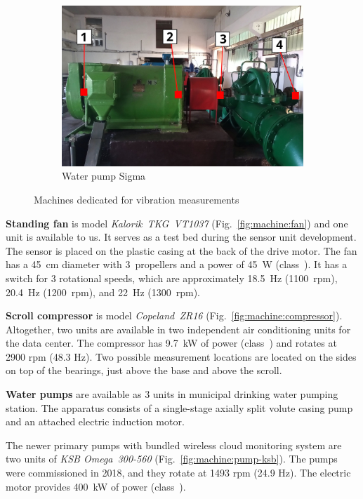 \begin{figure}[ht]
\begin{subfigure}[b]{0.31\textwidth}
        \includegraphics[width=\textwidth]{assets/design/sensor/sigma-pump.jpg}
        \caption{\footnotesize Water pump Sigma}
        \label{fig:machine:pump-sigma}
    \end{subfigure}
    \caption{Machines dedicated for vibration measurements}
\end{figure}

\textbf{Standing fan} is model \emph{Kalorik~TKG~VT1037} (Fig.~\ref{fig:machine:fan}) and one unit is available to us. It serves as a test bed during the sensor unit development. The sensor is placed on the plastic casing at the back of the drive motor. The fan has a 45~cm diameter with 3~propellers and a power of 45~W (class~). It has a switch for 3 rotational speeds, which are approximately 18.5~Hz (1100~rpm), 20.4~Hz (1200~rpm), and 22~Hz (1300~rpm).

\textbf{Scroll compressor} is model \emph{Copeland~ZR16} (Fig.~\ref{fig:machine:compressor}). Altogether, two units are available in two independent air conditioning units for the data center. The compressor has 9.7~kW of power (class~) and rotates at 2900 rpm (48.3 Hz). Two possible measurement locations are located on the sides on top of the bearings, just above the base and above the scroll.

\textbf{Water pumps} are available as 3 units in municipal drinking water pumping station. The apparatus consists of a single-stage axially split volute casing pump and an attached electric induction motor. 

The newer primary pumps with bundled wireless cloud monitoring system are two units of \emph{KSB Omega~300-560} (Fig.~\ref{fig:machine:pump-ksb}). The pumps were commissioned in 2018, and they rotate at 1493 rpm (24.9 Hz). The electric motor provides 400~kW of power (class~).

